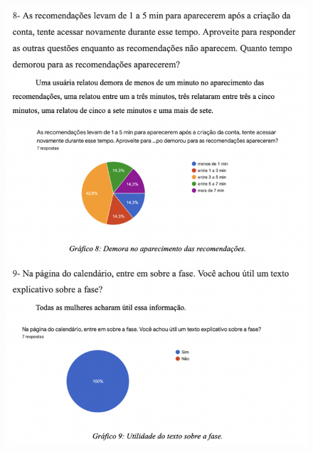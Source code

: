 \begin{apendicesenv}
\begin{figure}[ht]
        \includegraphics[keepaspectratio=true,scale=0.8]{figuras/ap5.png}
    \end{figure}
    \begin{figure}[ht]
        \centering

\end{figure}
\end{apendicesenv}
